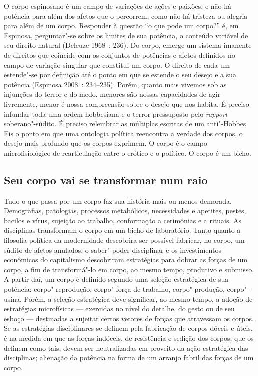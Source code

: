 O corpo espinosano é um campo de variações de ações e paixões, e não há
potência para além dos afetos que o percorrem, como não há tristeza ou
alegria para além de um corpo. Responder à questão ``o que pode um
corpo?'' é, em Espinosa, perguntar"-se sobre os limites de sua potência,
o conteúdo variável de seu direito natural (Deleuze 1968~: 236). Do
corpo, emerge um sistema imanente de direitos que coincide com os
conjuntos de potências e afetos definidos no campo de variação singular
que constitui um corpo. O direito de cada um estende"-se por definição
até o ponto em que se estende o seu desejo e a sua potência (Espinosa
2008~: 234--235). Porém, quanto mais vivemos sob as injunções do terror e
do medo, menores são nossas capacidades de agir livremente, menor é
nossa compreensão sobre o desejo que nos habita. É preciso infundar toda
uma ordem hobbesiana e o terror pressuposto pelo \emph{rapport}
soberano"-súdito. É preciso relembrar as múltiplas escritas de um
anti"-Hobbes. Eis o ponto em que uma ontologia política reencontra a
verdade dos corpos, o desejo mais profundo que os corpos exprimem. O
corpo é o campo microfisiológico de rearticulação entre o erótico e o
político. O corpo é um bicho.

\subsection{Seu corpo vai se transformar num raio}

Tudo o que passa por um
corpo faz sua história mais ou menos demorada. Demografias, patologias,
processos metabólicos, necessidades e apetites, pestes, bacilos e vírus,
sujeição ao trabalho, conformação a cerimônias e a rituais. As
disciplinas transformam o corpo em um bicho de laboratório. Tanto quanto
a filosofia política da modernidade descobrira ser possível fabricar, no
corpo, um súdito de afetos anulados, o saber"-poder disciplinar e os
investimentos econômicos do capitalismo descobriram estratégias para
dobrar as forças de um corpo, a fim de transformá"-lo em corpo, ao mesmo
tempo, produtivo e submisso. A partir daí, um corpo é definido segundo
uma seleção estratégica de sua potência: corpo"-reprodução, corpo"-força
de trabalho, corpo"-produção, corpo"-usina. Porém, a seleção estratégica
deve significar, ao mesmo tempo, a adoção de estratégias microfísicas ---
exercidas no nível do detalhe, do gesto ou de seu esboço --- destinadas a
sujeitar certos vetores de forças que atravessam os corpos. Se as
estratégias disciplinares se definem pela fabricação de corpos dóceis e
úteis, é na medida em que as forças indóceis, de resistência e sedição
dos corpos, que os definem como tais, devem ser neutralizadas em
proveito da ação estratégica das disciplinas; alienação da potência na
forma de um arranjo fabril das forças de um corpo.

